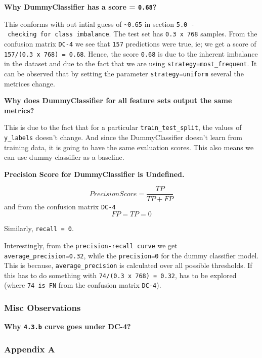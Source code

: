 \documentclass[11pt]{article}
\begin{document}
\textbf{Why DummyClassifier has a score = \texttt{0.68}?}

This conforms with out intial guess of \texttt{\textasciitilde{}0.65} in
section \texttt{5.0\ -\ checking\ for\ class\ imbalance}. The test set
has \texttt{0.3\ x\ 768} samples. From the confusion matrix
\texttt{DC-4} we see that \texttt{157} predictions were true, ie; we get
a score of \texttt{157/(0.3\ x\ 768)\ =\ 0.68}. Hence, the score
\texttt{0.68} is due to the inherent imbalance in the dataset and due to
the fact that we are using \texttt{strategy=most\_frequent}. It can be
observed that by setting the parameter \texttt{strategy=uniform} several
the metrices change.

\textbf{Why does DummyClassifier for all feature sets output the same
metrics?}

This is due to the fact that for a particular
\texttt{train\_test\_split}, the values of \texttt{y\_labels} doesn't
change. And since the DummyClassifier doesn't learn from training data,
it is going to have the same evaluation scores. This also means we can
use dummy classifier as a baseline.

\textbf{Precision Score for DummyClassifier is Undefined.}

\[Precision Score = \frac{TP}{TP+FP}\] and from the confusion matrix
\texttt{DC-4} \[FP=TP=0\]

Similarly, \texttt{recall\ =\ 0}.

Interestingly, from the \texttt{precision-recall\ curve} we get
\texttt{average\_precision=0.32}, while the \texttt{precision=0} for the
dummy classifier model. This is because, \texttt{average\_precision} is
calculated over all possible thresholds. If this has to do something
with \texttt{74/(0.3\ x\ 768)\ =\ 0.32}, has to be explored (where
\texttt{74\ is\ FN} from the confusion matrix \texttt{DC-4}).

\hypertarget{misc-observations}{%
\subsubsection{Misc Observations}\label{misc-observations}}

\textbf{Why \texttt{4.3.b} curve goes under DC-4?}

    \hypertarget{appendix-a}{%
\subsubsection{Appendix A}\label{appendix-a}}
\end{document}
